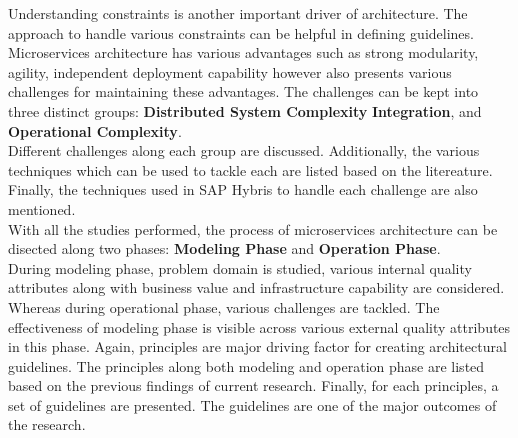 Understanding constraints is another important driver of architecture. The approach to handle various constraints can be helpful in defining guidelines. Microservices architecture has various advantages such as strong modularity, agility, independent deployment capability however also presents various challenges for maintaining these advantages. The challenges can be kept into three distinct groups: 
\textbf{Distributed System Complexity}
\textbf{Integration}, and
\textbf{Operational Complexity}.\\
Different challenges along each group are discussed. Additionally, the various techniques which can be used to tackle each  are listed based on the litereature. Finally, the techniques used in SAP Hybris to handle each challenge are also mentioned.\\
With all the studies performed, the process of microservices architecture can be disected along two phases:
\textbf{Modeling Phase} and 
\textbf{Operation Phase}.\\
During modeling phase, problem domain is studied, various internal quality attributes along with business value and infrastructure capability are considered. Whereas during operational phase, various challenges are tackled. The effectiveness of modeling phase is visible across various external quality attributes in this phase. Again, principles are major driving factor for creating architectural guidelines. The principles along both modeling and operation phase are listed based on the previous findings of current research. Finally, for each principles, a set of guidelines are presented. The guidelines are one of the major outcomes of the research.
